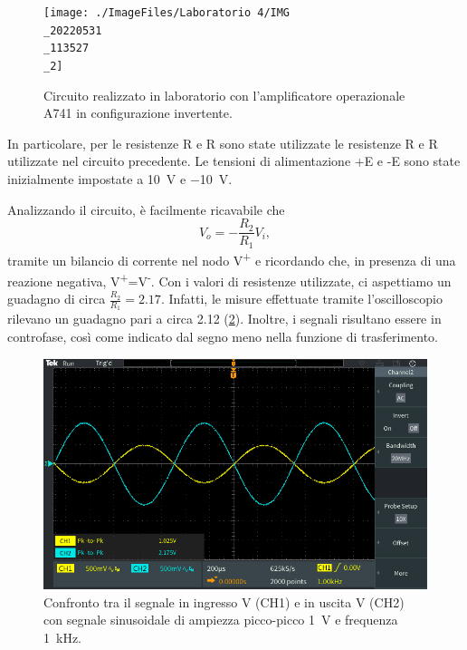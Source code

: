 \begin{figure}[h!]
	\centering
	\texttt{[image: ./ImageFiles/Laboratorio 4/IMG\\\_20220531\\\_113527\\\_2]}
	\caption{Circuito realizzato in laboratorio con l'amplificatore operazionale \textmu A741 in configurazione invertente.}
	\label{fig:opamp_inv_circuito}
\end{figure}

\noindent
In particolare, per le resistenze R e R sono state utilizzate le resistenze R e R utilizzate nel circuito precedente. Le tensioni di alimentazione +E e -E sono state inizialmente impostate a \SI{+10}{\volt} e \SI{-10}{\volt}.

\noindent
Analizzando il circuito, è facilmente ricavabile che 
\begin{equation}
	V_o=-\frac{R_2}{R_1}V_i,
\end{equation}
tramite un bilancio di corrente nel nodo V\textsuperscript{+} e ricordando che, in presenza di una reazione negativa, V\textsuperscript{+}=V\textsuperscript{-}. Con i valori di resistenze utilizzate, ci aspettiamo un guadagno di circa $\frac{R_2}{R_1}=2.17$. Infatti, le misure effettuate tramite l'oscilloscopio rilevano un guadagno pari a circa 2.12 (\Fig\ref{fig:opamp_inv_amp}). Inoltre, i segnali risultano essere in controfase, così come indicato dal segno meno nella funzione di trasferimento.
\begin{figure}[h!]
	\centering
	\includegraphics[width=0.7\linewidth]{./ImageFiles/Laboratorio 4/TEK00005}
	\caption{Confronto tra il segnale in ingresso V (CH1)  e in uscita V (CH2) con segnale sinusoidale di ampiezza picco-picco \SI{1}{\volt} e frequenza \SI{1}{\kilo\hertz}.}
	\label{fig:opamp_inv_amp}
\end{figure}

